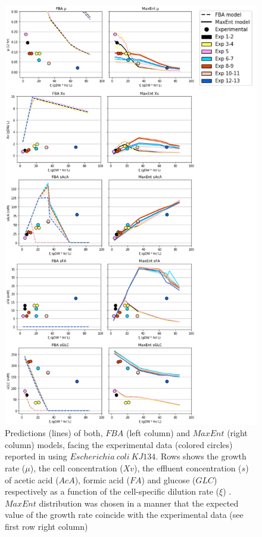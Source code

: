 \documentclass[]{article}
\begin{document}
	\begin{figure}
		\centering
		\includegraphics[scale = 0.7]{plots_s_EColi}
		\caption{Predictions (lines) of both, $FBA$ (left column) and $MaxEnt$ (right column) models, facing the experimental data (colored circles) reported in \protect{} using $Escherichia\ coli\ KJ134$. Rows shows the growth rate ($\mu$), the cell concentration ($Xv$), the effluent concentration ($s$) of acetic acid ($AcA$), formic acid ($FA$) and glucose ($GLC$) respectively as a function of the cell-specific dilution rate ($\xi$) . $MaxEnt$ distribution was chosen in a manner that the expected value of the growth rate coincide with the experimental data (see first row right column)}
	\end{figure}
	
\end{document}
